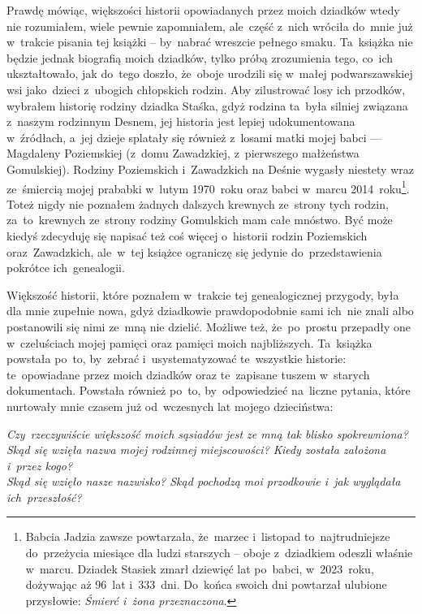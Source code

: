 Prawdę mówiąc, większości historii opowiadanych przez moich dziadków wtedy nie
rozumiałem, wiele pewnie zapomniałem, ale~część z~nich wróciła do~mnie już
w~trakcie pisania tej książki -- by~nabrać wreszcie pełnego smaku. Ta~książka
nie będzie jednak biografią moich dziadków, tylko próbą zrozumienia tego,
co~ich ukształtowało, jak do~tego doszło, że~oboje urodzili się w~małej
podwarszawskiej wsi jako~dzieci z~ubogich chłopskich rodzin. Aby zilustrować
losy ich przodków, wybrałem historię rodziny dziadka Staśka, gdyż rodzina
ta~była silniej związana z~naszym rodzinnym Desnem, jej historia jest lepiej
udokumentowana w~źródłach, a~jej dzieje splatały się również z~losami matki
mojej babci — Magdaleny
Poziemskiej
(z~domu Zawadzkiej, z~pierwszego małżeństwa Gomulskiej). Rodziny Poziemskich
i~Zawadzkich na Deśnie wygasły niestety wraz ze~śmiercią mojej prababki
w~lutym 1970~roku oraz babci w~marcu 2014~roku\footnote{Babcia Jadzia zawsze
powtarzała, że~marzec i~listopad to~najtrudniejsze do~przeżycia miesiące dla
ludzi starszych -- oboje z~dziadkiem odeszli właśnie w~marcu. Dziadek Stasiek
zmarł dziewięć lat po~babci, w~2023~roku, dożywając aż 96~lat i~333~dni.
Do~końca swoich dni powtarzał ulubione przysłowie: \emph{Śmierć i~żona
przeznaczona}.}. Toteż nigdy nie poznałem żadnych dalszych krewnych ze~strony
tych rodzin, za~to~krewnych ze~strony rodziny Gomulskich mam całe mnóstwo.
Być może kiedyś zdecyduję się napisać też coś więcej o~historii rodzin
Poziemskich oraz~Zawadzkich, ale~w~tej książce ograniczę się jedynie
do~przedstawienia pokrótce ich~genealogii.

Większość historii, które poznałem w~trakcie tej genealogicznej przygody, była
dla mnie zupełnie nowa, gdyż dziadkowie prawdopodobnie sami ich~nie znali
albo postanowili się nimi ze~mną nie dzielić. Możliwe też, że~po~prostu
przepadły one w~czeluściach mojej pamięci oraz pamięci moich najbliższych.
Ta~książka powstała po~to, by~zebrać i~usystematyzować te~wszystkie historie:
te~opowiadane przez moich dziadków oraz te~zapisane tuszem w~starych
dokumentach. Powstała również po~to, by~odpowiedzieć na~liczne pytania, które
nurtowały mnie czasem już od~wczesnych lat mojego dzieciństwa:

\begin{center}
\emph{Czy~rzeczywiście większość moich sąsiadów jest ze mną tak blisko
spokrewniona?} \\
\emph{Skąd się wzięła nazwa mojej rodzinnej miejscowości? Kiedy została
założona i~przez kogo?} \\
\emph{Skąd się wzięło nasze nazwisko? Skąd pochodzą moi przodkowie i~jak
wyglądała ich~przeszłość?}
\end{center}

